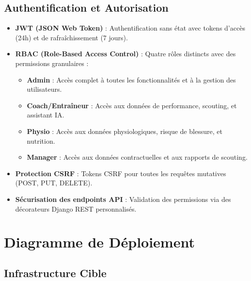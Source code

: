 \subsection{Authentification et Autorisation}

\begin{itemize}
    \item \textbf{JWT (JSON Web Token)} : Authentification sans état avec tokens d'accès (24h) et de rafraîchissement (7 jours).
    \item \textbf{RBAC (Role-Based Access Control)} : Quatre rôles distincts avec des permissions granulaires :
    \begin{itemize}
        \item \textbf{Admin} : Accès complet à toutes les fonctionnalités et à la gestion des utilisateurs.
        \item \textbf{Coach/Entraîneur} : Accès aux données de performance, scouting, et assistant IA.
        \item \textbf{Physio} : Accès aux données physiologiques, risque de blessure, et nutrition.
        \item \textbf{Manager} : Accès aux données contractuelles et aux rapports de scouting.
    \end{itemize}
    \item \textbf{Protection CSRF} : Tokens CSRF pour toutes les requêtes mutatives (POST, PUT, DELETE).
    \item \textbf{Sécurisation des endpoints API} : Validation des permissions via des décorateurs Django REST personnalisés.
\end{itemize}

\section{Diagramme de Déploiement}

\subsection{Infrastructure Cible}

